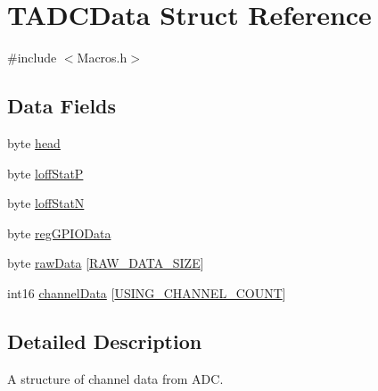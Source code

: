 \hypertarget{struct_t_a_d_c_data}{\section{T\-A\-D\-C\-Data Struct Reference}
\label{struct_t_a_d_c_data}
}


{\ttfamily \#include $<$Macros.\-h$>$}

\subsection*{Data Fields}
\begin{DoxyCompactItemize}
\item 
byte \hyperlink{struct_t_a_d_c_data_a1801fde7da36697bfb69b689e69dcea0}{head}
\item 
byte \hyperlink{struct_t_a_d_c_data_af4ececaa8f89b0c4f7fc0a5e8af51957}{loff\-Stat\-P}
\item 
byte \hyperlink{struct_t_a_d_c_data_a514639df5e96bcd485f3f1265b69c8ad}{loff\-Stat\-N}
\item 
byte \hyperlink{struct_t_a_d_c_data_a5c28a29a781e6c6cf83bed5d0c1b4669}{reg\-G\-P\-I\-O\-Data}
\item 
byte \hyperlink{struct_t_a_d_c_data_a6f8de47858b52ff0e3612ebff5b3680b}{raw\-Data} \mbox{[}\hyperlink{group___a_d_c_const_ga324659f8cc7fd46c718a4b405c0753d6}{R\-A\-W\-\_\-\-D\-A\-T\-A\-\_\-\-S\-I\-Z\-E}\mbox{]}
\item 
int16 \hyperlink{struct_t_a_d_c_data_a51d30c3c2c3622e1e6e521cb8100209d}{channel\-Data} \mbox{[}\hyperlink{group___a_d_c_const_gadee91c7f97e44412335dbe4713a29613}{U\-S\-I\-N\-G\-\_\-\-C\-H\-A\-N\-N\-E\-L\-\_\-\-C\-O\-U\-N\-T}\mbox{]}
\end{DoxyCompactItemize}


\subsection{Detailed Description}
A structure of channel data from A\-D\-C.

